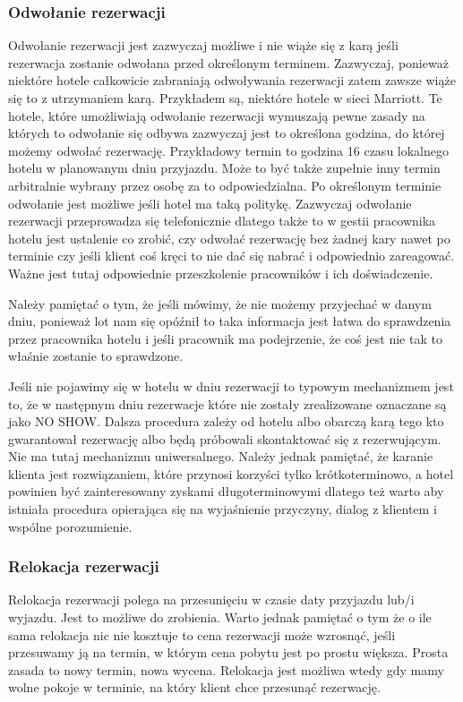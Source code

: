 \documentclass[a4paper,onecolumn,oneside,11pt,wide,floatssmall]{mwrep}
\theoremstyle{definition}
\theoremstyle{plain}%
\theoremstyle{remark}
\begin{document}
\subsubsection{Odwołanie rezerwacji}
Odwołanie rezerwacji jest zazwyczaj możliwe i nie wiąże się z karą jeśli 
rezerwacja zostanie odwołana przed określonym terminem. Zazwyczaj, ponieważ
niektóre hotele całkowicie zabraniają odwoływania rezerwacji zatem zawsze wiąże
się to z utrzymaniem karą. Przykładem są, niektóre hotele w sieci Marriott.
Te hotele, które umożliwiają odwołanie rezerwacji wymuszają pewne
zasady na których to odwołanie się odbywa zazwyczaj jest to określona godzina,
do której możemy odwołać rezerwację. Przykładowy termin to godzina 16 czasu
lokalnego hotelu w planowanym dniu przyjazdu. Może to być także zupełnie inny termin arbitralnie wybrany przez osobę za to odpowiedzialna. 
  Po określonym terminie odwołanie jest możliwe jeśli hotel ma taką politykę. 
  Zazwyczaj odwołanie rezerwacji przeprowadza się telefonicznie dlatego także to w gestii 
  pracownika hotelu jest ustalenie co zrobić, czy odwołać rezerwację bez żadnej kary nawet po terminie
   czy jeśli klient coś kręci to nie dać się nabrać i odpowiednio zareagować. 
  Ważne jest tutaj odpowiednie przeszkolenie pracowników i ich doświadczenie.
  
  Należy pamiętać o tym, że jeśli mówimy, że nie możemy przyjechać w danym dniu,
  ponieważ lot nam się opóźnił to taka informacja jest łatwa do sprawdzenia
  przez pracownika hotelu i jeśli pracownik ma podejrzenie, że coś jest nie tak
  to właśnie zostanie to sprawdzone.

Jeśli nie pojawimy się w hotelu w dniu rezerwacji to typowym mechanizmem jest
to, że w następnym dniu rezerwacje które nie zostały zrealizowane oznaczane są
jako NO SHOW. Dalsza procedura zależy od hotelu albo obarczą karą tego kto
gwarantował rezerwację albo będą próbowali skontaktować się z rezerwującym. Nie
ma tutaj mechanizmu uniwersalnego. Należy jednak pamiętać, że karanie klienta
jest rozwiązaniem, które przynosi korzyści tylko krótkoterminowo, a hotel
powinien być zainteresowany zyskami długoterminowymi dlatego też warto aby
istniała procedura opierająca się na wyjaśnienie przyczyny, dialog z klientem i
wspólne porozumienie.

\subsubsection{Relokacja rezerwacji}
Relokacja rezerwacji polega na przesunięciu w czasie daty 
przyjazdu lub/i wyjazdu. Jest to możliwe do zrobienia. Warto jednak pamiętać o
tym że o ile sama relokacja nic nie kosztuje to cena rezerwacji może 
wzrosnąć, jeśli przesuwamy ją na termin, w którym cena pobytu jest po prostu 
większa. Prosta zasada to nowy termin, nowa wycena. Relokacja jest możliwa 
wtedy gdy mamy wolne pokoje w terminie, na który klient chce przesunąć
rezerwację.
\end{document}

